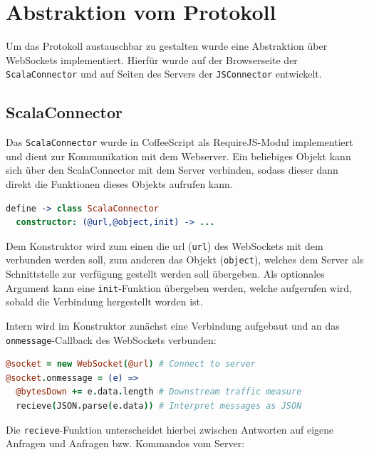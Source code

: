 \section{Abstraktion vom Protokoll}
\label{sec:jsc}

Um das Protokoll austauschbar zu gestalten wurde eine Abstraktion über WebSockets implementiert.
Hierfür wurde auf der Browserseite der \texttt{ScalaConnector} und auf Seiten des Servers der
\texttt{JSConnector} entwickelt.

\subsection{ScalaConnector}

Das \texttt{ScalaConnector} wurde in CoffeeScript als RequireJS-Modul implementiert und dient zur
Kommunikation mit dem Webserver. Ein beliebiges Objekt kann sich über den ScalaConnector mit dem
Server verbinden, sodass dieser dann direkt die Funktionen dieses Objekts aufrufen kann.

\begin{lstlisting}[language=coffee]
define -> class ScalaConnector
  constructor: (@url,@object,init) -> ...
\end{lstlisting}

Dem Konstruktor wird zum einen die url (\texttt{url}) des WebSockets mit dem verbunden werden soll,
zum anderen das Objekt (\texttt{object}), welches dem Server als Schnittstelle zur verfügung
gestellt werden soll übergeben. Als optionales Argument kann eine \texttt{init}-Funktion übergeben
werden, welche aufgerufen wird, sobald die Verbindung hergestellt worden ist.

Intern wird im Konstruktor zunächst eine Verbindung aufgebaut und an das
\texttt{onmessage}-Callback des WebSockets verbunden:

\begin{lstlisting}[language=coffee]
@socket = new WebSocket(@url) # Connect to server
@socket.onmessage = (e) =>    
  @bytesDown += e.data.length # Downstream traffic measure
  recieve(JSON.parse(e.data)) # Interpret messages as JSON
\end{lstlisting}

Die \texttt{recieve}-Funktion unterscheidet hierbei zwischen Antworten auf eigene Anfragen und
Anfragen bzw. Kommandos vom Server:

